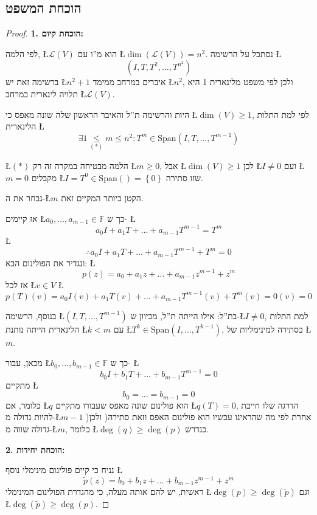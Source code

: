 \documentclass[english,hebrew]{article}
\begin{document}
\subsection{הוכחת המשפט}
\begin{proof}
\textbf{1. הוכחת קיום:}

לפי הלמה, \L{$\mathcal{L}\left(V\right)$} הוא מ\textquotedblright ו
עם \L{$\dim\left(\mathcal{L}\left(V\right)\right)=n^{2}$}. נסתכל
על הרשימה \L{%
\[
\left(I,T,T^{2},\ldots,T^{n^{2}}\right)
\]
}%
ברשימה זאת יש \L{$n^{2}+1$} איברים במרחב ממימד \L{$n^{2}$}, ולכן
לפי משפט מלינארית 1 היא תלויה לינארית במרחב \L{$\mathcal{L}\left(V\right)$}.

היות והרשימה ת\textquotedblright ל והאיבר הראשון שלה שונה מאפס כי
\L{$\dim\left(V\right)\ge1$}, לפי למת התלות הלינארית \L{%
\[
\exists1\underset{(*)}{\le}m\le n^{2}:T^{m}\in\text{Span}\left(I,T,\ldots,T^{m-1}\right)
\]
}%

\L{$(*)$} הלמה מבטיחה במקרה זה רק \L{$m\ge0$}, אבל \L{$\dim\left(V\right)\ge1$}
לכן \L{$I\ne0$} ועם \L{$m=0$} מקבלים \L{$I=T^{0}\in\text{Span}\left(\right)=\left\{ 0\right\} $}
שזו סתירה.

נבחר את ה-\L{$m$} הקטן ביותר המקיים זאת.

אז קיימים \L{$a_{0},\dots,a_{m-1}\in\mathbb{F}$} כך ש- \L{%
\[
a_{0}I+a_{1}T+\dots+a_{m-1}T^{m-1}=T^{m}
\]
}%
\L{%
\[
\therefore a_{0}I+a_{1}T+\dots+a_{m-1}T^{m-1}+T^{m}=0
\]
}%
ונגדיר את הפולינום הבא: \L{%
\[
p(z)=a_{0}+a_{1}z+\dots+a_{m-1}z^{m-1}+z^{m}
\]
}%
אז לכל \L{$v\in V$} \L{%
\[
p(T)(v)=a_{0}I(v)+a_{1}T(v)+\dots+a_{m-1}T^{m-1}(v)+T^{m}(v)=0(v)=0
\]
}%

בנוסף, הרשימה \L{$\left(I,T,\ldots,T^{m-1}\right)$} בת\textquotedblright ל:
אילו הייתה ת\textquotedblright ל, מכיוון ש-\L{$I\neq0$}, למת התלות
הלינארית הייתה נותנת \L{$k<m$} עם \L{$T^{k}\in\text{Span}\left(I,\ldots,T^{k-1}\right)$},
בסתירה למינימליות של \L{$m$}.

מכאן, עבור \L{$b_{0},\dots,b_{m-1}\in\mathbb{F}$} כך ש- \L{%
\[
b_{0}I+b_{1}T+\dots+b_{m-1}T^{m-1}=0
\]
}%
מתקיים \L{%
\[
b_{0}=\dots=b_{m-1}=0
\]
}%
כלומר, אם \L{$q$} הוא פולינום שונה מאפס שעבורו מתקיים \L{$q(T)=0$},
הדרגה שלו חייבת להיות גדולה מ-\L{$m-1$} )אחרת לפי מה שהראינו עכשיו
הוא פולינום האפס וזאת סתירה( ולכן גדולה שווה מ-\L{$m$}, כלומר \L{$\deg(q)\ge\deg(p)$}
כנדרש.

\textbf{2. הוכחת יחידות:}

נניח כי קיים פולינום מינימלי נוסף \L{%
\[
\widetilde{p}(z)=b_{0}+b_{1}z+\dots+b_{m-1}z^{m-1}+z^{m}
\]
}%
ראשית, יש להם אותה מעלה, כי מהגדרת הפולינום המינימלי \L{$\deg(p)\ge\deg(\widetilde{p})$}
וגם \L{$\deg(\widetilde{p})\ge\deg(p)$}.


\end{proof}
\end{document}
